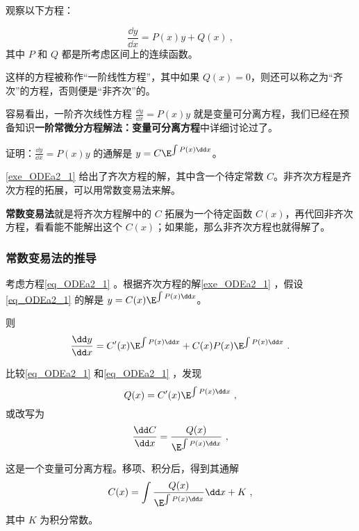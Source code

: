 

观察以下方程：

\begin{equation}\label{eq_ODEa2_1}
\frac{\dd y}{\dd x}=P(x)y+Q(x)~,
\end{equation}
其中 $P$ 和 $Q$ 都是所考虑区间上的连续函数。

这样的方程被称作“一阶线性方程”，其中如果 $Q(x)=0$，则还可以称之为“齐次”的方程，否则便是“非齐次”的。

容易看出，一阶齐次线性方程 $\frac{\dd y}{\dd x}=P(x)y$ 就是变量可分离方程，我们已经在预备知识\textbf{一阶常微分方程解法：变量可分离方程}中详细讨论过了。

\begin{exercise}{}\label{exe_ODEa2_1}
证明：$\frac{\dd y}{\dd x}=P(x)y$ 的通解是 $y=C\E^{\int P(x)\dd x}$。
\end{exercise}

\autoref{exe_ODEa2_1} 给出了齐次方程的解，其中含一个待定常数 $C$。非齐次方程是齐次方程的拓展，可以用常数变易法来解。

\textbf{常数变易法}就是将齐次方程解中的 $C$ 拓展为一个待定函数 $C(x)$，再代回非齐次方程，看看能不能解出这个 $C(x)$；如果能，那么非齐次方程也就得解了。

\subsubsection{常数变易法的推导}
考虑方程\autoref{eq_ODEa2_1} 。根据齐次方程的解\autoref{exe_ODEa2_1} ，假设\autoref{eq_ODEa2_1} 的解是 $y=C(x)\E^{\int P(x)\dd x}$。

则
\begin{equation}
\begin{aligned}
\frac{\dd y}{\dd x}=C'(x)\E^{\int P(x)\dd x}+C(x)P(x)\E^{\int P(x)\dd x}~.
\end{aligned}
\end{equation}

比较\autoref{eq_ODEa2_1} 和\autoref{eq_ODEa2_1} ，发现
\begin{equation}
Q(x)=C'(x)\E^{\int P(x)\dd x}~,
\end{equation}
或改写为
\begin{equation}
\frac{\dd C}{\dd x}=\frac{Q(x)}{\E^{\int P(x)\dd x}}~,
\end{equation}

这是一个变量可分离方程。移项、积分后，得到其通解
\begin{equation}
C(x)=\int\frac{Q(x)}{\E^{\int P(x)\dd x}}\dd x+K~,
\end{equation}
其中 $K$ 为积分常数。

